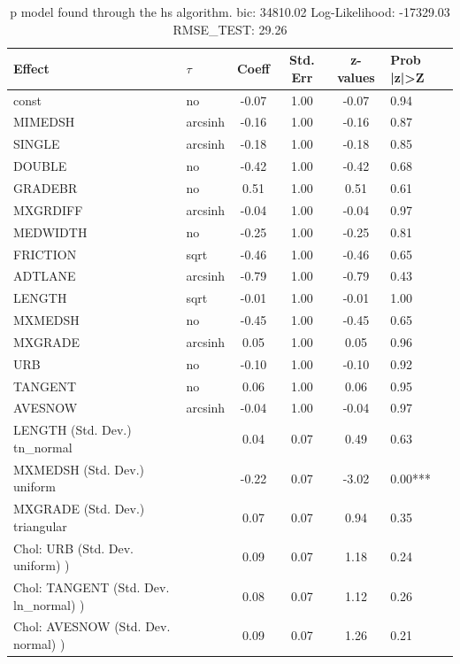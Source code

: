 \begin{table}
	\caption{p model found through the hs algorithm. bic: 34810.02 Log-Likelihood: -17329.03 RMSE_TEST: 29.26}
	\begin{center}
		\begin{tabular}{|l|l|c|c|c|l|}
			\hline
			Effect & $\tau$ & Coeff & Std. Err & z-values & Prob |z|>Z \\
			\hline
			const & no & -0.07 & 1.00 & -0.07 & 0.94 \\
			\hline
			MIMEDSH & arcsinh & -0.16 & 1.00 & -0.16 & 0.87 \\
			\hline
			SINGLE & arcsinh & -0.18 & 1.00 & -0.18 & 0.85 \\
			\hline
			DOUBLE & no & -0.42 & 1.00 & -0.42 & 0.68 \\
			\hline
			GRADEBR & no & 0.51 & 1.00 & 0.51 & 0.61 \\
			\hline
			MXGRDIFF & arcsinh & -0.04 & 1.00 & -0.04 & 0.97 \\
			\hline
			MEDWIDTH & no & -0.25 & 1.00 & -0.25 & 0.81 \\
			\hline
			FRICTION & sqrt & -0.46 & 1.00 & -0.46 & 0.65 \\
			\hline
			ADTLANE & arcsinh & -0.79 & 1.00 & -0.79 & 0.43 \\
			\hline
			LENGTH & sqrt & -0.01 & 1.00 & -0.01 & 1.00 \\
			\hline
			MXMEDSH & no & -0.45 & 1.00 & -0.45 & 0.65 \\
			\hline
			MXGRADE & arcsinh & 0.05 & 1.00 & 0.05 & 0.96 \\
			\hline
			URB & no & -0.10 & 1.00 & -0.10 & 0.92 \\
			\hline
			TANGENT & no & 0.06 & 1.00 & 0.06 & 0.95 \\
			\hline
			AVESNOW & arcsinh & -0.04 & 1.00 & -0.04 & 0.97 \\
			\hline
			LENGTH (Std. Dev.) tn_normal &  & 0.04 & 0.07 & 0.49 & 0.63 \\
			\hline
			MXMEDSH (Std. Dev.) uniform &  & -0.22 & 0.07 & -3.02 & 0.00*** \\
			\hline
			MXGRADE (Std. Dev.) triangular &  & 0.07 & 0.07 & 0.94 & 0.35 \\
			\hline
			 Chol: URB (Std. Dev. uniform) ) &  & 0.09 & 0.07 & 1.18 & 0.24 \\
			\hline
			 Chol: TANGENT (Std. Dev. ln_normal) ) &  & 0.08 & 0.07 & 1.12 & 0.26 \\
			\hline
			 Chol: AVESNOW (Std. Dev. normal) ) &  & 0.09 & 0.07 & 1.26 & 0.21 \\

\end{tabular}
\end{center}
\end{table}
